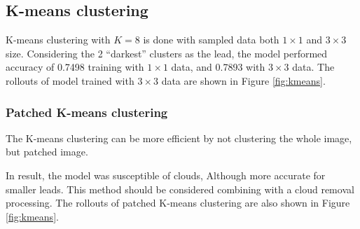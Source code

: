 \documentclass{article}
\begin{document}
    \subsection{K-means clustering} \label{sec:kmeans}
        K-means clustering with $K = 8$ is done with sampled data
        both $1\times 1$ and $3\times 3$ size.
        Considering the 2 ``darkest'' clusters as the lead,
        the model performed accuracy of 0.7498 training with $1\times 1$ data,
        and 0.7893 with $3\times 3$ data.
        The rollouts of model trained with $3\times 3$ data
        are shown in Figure \ref{fig:kmeans}.

        \subsubsection{Patched K-means clustering}
            The K-means clustering can be more efficient by
            not clustering the whole image, but patched image.
            
            In result, the model was susceptible of clouds,
            Although more accurate for smaller leads.
            This method should be considered combining
            with a cloud removal processing.
            The rollouts of patched K-means clustering are also
            shown in Figure \ref{fig:kmeans}.
\end{document}

